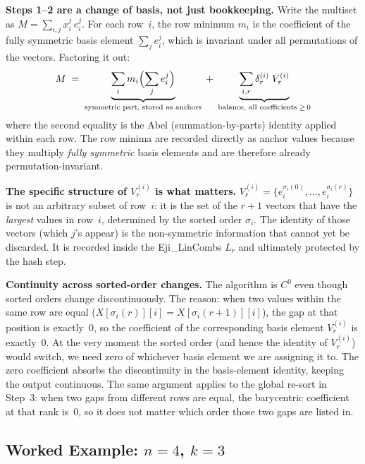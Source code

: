 \documentclass[11pt,a4paper]{article}
\newcommand{\eji}[2]{e^{#1}_{#2}}           %
\begin{document}
\textbf{Steps 1--2 are a change of basis, not just bookkeeping.}
Write the multiset as $M = \sum_{i,j} x^j_i\, \eji{j}{i}$.
For each row~$i$, the row minimum $m_i$ is the coefficient of the
fully symmetric basis element $\sum_j \eji{j}{i}$, which is invariant under
all permutations of the vectors.  Factoring it out:
\[
  M \;=\; \underbrace{\sum_i m_i \Bigl(\sum_j \eji{j}{i}\Bigr)}_{\text{symmetric part, stored as anchors}}
   \;+\; \underbrace{\sum_{i,r} \delta^{(i)}_r\; V^{(i)}_r}_{\text{balance, all coefficients}\; \ge\, 0}
\]
where the second equality is the Abel (summation-by-parts) identity applied
within each row.  The row minima are recorded directly as anchor values
because they multiply \emph{fully symmetric} basis elements and are
therefore already permutation-invariant.

\textbf{The specific structure of $V^{(i)}_r$ is what matters.}
$V^{(i)}_r = \{\eji{\sigma_i(0)}{i},\ldots,\eji{\sigma_i(r)}{i}\}$ is
not an arbitrary subset of row~$i$: it is the set of the $r{+}1$ vectors that
have the \emph{largest} values in row~$i$, determined by the sorted order $\sigma_i$.
The identity of those vectors (which $j$'s appear) is the non-symmetric information
that cannot yet be discarded.  It is recorded inside the Eji\_LinCombs $L_r$
and ultimately protected by the hash step.

\textbf{Continuity across sorted-order changes.}
The algorithm is $C^0$ even though sorted orders change discontinuously.
The reason: when two values within the same row are equal
($X[\sigma_i(r)][i] = X[\sigma_i(r+1)][i]$), the gap at that position
is exactly~$0$, so the coefficient of the corresponding basis element
$V^{(i)}_r$ is exactly~$0$.  At the very moment the sorted order (and hence
the identity of $V^{(i)}_r$) would switch, we need zero of whichever basis
element we are assigning it to.  The zero coefficient absorbs the
discontinuity in the basis-element identity, keeping the output continuous.
The same argument applies to the global re-sort in Step~3: when two gaps
from different rows are equal, the barycentric coefficient at that rank
is~$0$, so it does not matter which order those two gaps are listed in.

\subsection*{Worked Example: $n=4$, $k=3$}
\end{document}
